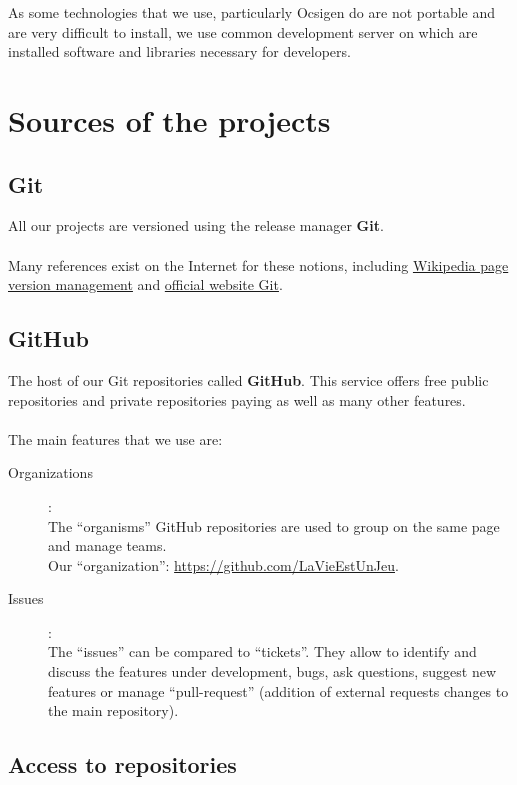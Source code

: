 \documentclass{life-fr}
\begin{document}
As some technologies that we use, particularly Ocsigen do
are not portable and are very difficult to install, we use
common development server on which are installed
software and libraries necessary for developers.

\section{Sources of the projects}

\subsection{Git}

All our projects are versioned using the release manager
\textbf{Git}.\\
\\
Many references exist on the Internet for these notions, including
\href{http://fr.wikipedia.org/wiki/Gestion_de_versions}{Wikipedia page
version management}
and \href{http://git-scm.com/}{official website Git}.

\subsection{GitHub}

The host of our Git repositories called \textbf{GitHub}. This service
offers free public repositories and private repositories paying
as well as many other features.\\
\\
The main features that we use are:
\begin{description}
  \item [Organizations]: \\
    The ``organisms'' GitHub repositories are used to group
    on the same page and manage teams.\\
    Our ``organization'': \url{https://github.com/LaVieEstUnJeu}.
  \item [Issues]: \\
    The ``issues'' can be compared to ``tickets''. They allow
    to identify and discuss the features under development,
    bugs, ask questions, suggest new features
    or manage ``pull-request'' (addition of external requests
    changes to the main repository).\\
\end{description}

\subsection{Access to repositories}
\end{document}
